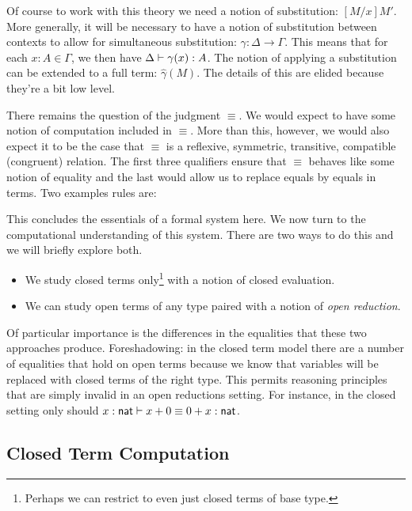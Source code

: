 \documentclass{article}
\begin{document}
Of course to work with this theory we need a notion of substitution:
$[M/x]M'$. More generally, it will be necessary to have a notion of
substitution between contexts to allow for simultaneous substitution:
$\gamma : \Delta \to \Gamma$. This means that for each
$x : A \in \Gamma$, we then have $\Delta \vdash \gamma(x) : A$. The
notion of applying a substitution can be extended to a full term:
$\hat{\gamma}(M)$. The details of this are elided because they're a
bit low level.

There remains the question of the judgment $\equiv$. We would expect
to have some notion of computation included in $\equiv$. More than
this, however, we would also expect it to be the case that $\equiv$ is
a reflexive, symmetric, transitive, compatible (congruent)
relation. The first three qualifiers ensure that $\equiv$ behaves like
some notion of equality and the last would allow us to replace equals
by equals in terms. Two examples rules are:
This concludes the essentials of a formal system here. We now turn to
the computational understanding of this system. There are two ways to
do this and we will briefly explore both.
\begin{itemize}
\item We study closed terms only\footnote{Perhaps we can restrict
  to even just closed terms of base type.} with a notion of closed
  evaluation.
\item We can study open terms of any type paired with a notion of
  \emph{open reduction}.
\end{itemize}
Of particular importance is the differences in the equalities that these two
approaches produce. Foreshadowing: in the closed term model there are
a number of equalities that hold on open terms because we know that
variables will be replaced with closed terms of the right type. This
permits reasoning principles that are simply invalid in an open
reductions setting. For instance, in the closed setting only should
$x: \mathsf{nat} \vdash x + 0 \equiv 0 + x : \mathsf{nat}$.

\subsection{Closed Term Computation}
\end{document}
